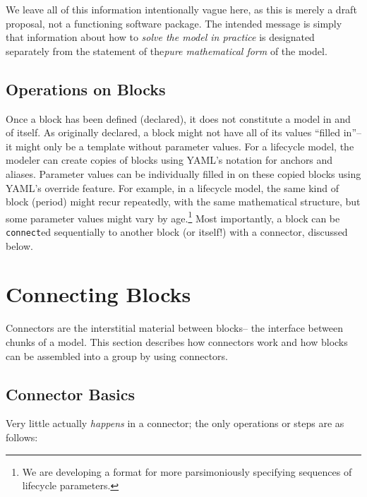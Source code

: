\documentclass[12pt,pdftex,letterpaper]{article}
\begin{document}
We leave all of this information intentionally vague here, as this is merely a draft proposal, not a functioning software package. The intended message is simply that information about how to \textit{solve the model in practice} is designated separately from the statement of the\textit{pure mathematical form} of the model.


\subsection{Operations on Blocks}

Once a block has been defined (declared), it does not constitute a model in and of itself. As originally declared, a block might not have all of its values ``filled in''-- it might only be a template without parameter values. For a lifecycle model, the modeler can create copies of blocks using YAML's notation for anchors and aliases. Parameter values can be individually filled in on these copied blocks using YAML's override feature. For example, in a lifecycle model, the same kind of block (period) might recur repeatedly, with the same mathematical structure, but some parameter values might vary by age.\footnote{We are developing a format for more parsimoniously specifying sequences of lifecycle parameters.} Most importantly, a block can be \texttt{connect}ed sequentially to another block (or itself!) with a connector, discussed below.


\section{Connecting Blocks}

Connectors are the interstitial material between blocks-- the interface between chunks of a model. This section describes how connectors work and how blocks can be assembled into a group by using connectors.


\subsection{Connector Basics}

Very little actually \textit{happens} in a connector; the only operations or steps are as follows:
\end{document}
